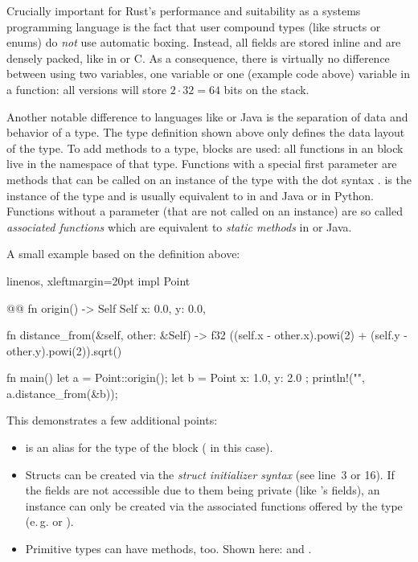Crucially important for Rust's performance and suitability as a systems programming language is the fact that user compound types (like structs or enums) do \emph{not} use automatic boxing.
Instead, all fields are stored inline and are densely packed, like in \cpp or C.
As a consequence, there is virtually no difference between using two  variables, one \code{[f32; 2]} variable or one  (example code above) variable in a function: all versions will store $2 \cdot 32 = 64$ bits on the stack.

Another notable difference to languages like \cpp or Java is the separation of data and behavior of a type.
The type definition shown above only defines the data layout of the type.
To add methods to a type,  blocks are used: all functions in an  block live in the namespace of that type.
Functions with a special first  parameter are methods that can be called on an instance of the type with the dot syntax .
 is the instance of the type and is usually equivalent to  in \cpp and Java or  in Python.
Functions without a  parameter (that are not called on an instance) are so called \emph{associated functions} which are equivalent to \emph{static methods} in \cpp or Java.

A small example based on the  definition above:

\begin{rustcode*}{linenos, xleftmargin=20pt}
impl Point { @@
    fn origin() -> Self {
        Self {
            x: 0.0,
            y: 0.0,
        }
    }

    fn distance_from(&self, other: &Self) -> f32 {
        ((self.x - other.x).powi(2) + (self.y - other.y).powi(2)).sqrt()
    }
}

fn main() {
    let a = Point::origin();
    let b = Point { x: 1.0, y: 2.0 };
    println!("{}", a.distance_from(&b));
}
\end{rustcode*}

This demonstrates a few additional points:

\vspace{-3mm}
\begin{itemize}
  \item {} is an alias for the type of the  block ( in this case).
  \item Structs can be created via the \emph{struct initializer syntax} (see line~3 or 16).
  If the fields are not accessible due to them being private (like 's fields), an instance can only be created via the associated functions offered by the type (e.\,g.  or ).
  \item Primitive types can have methods, too.
  Shown here:  and .
\end{itemize}

